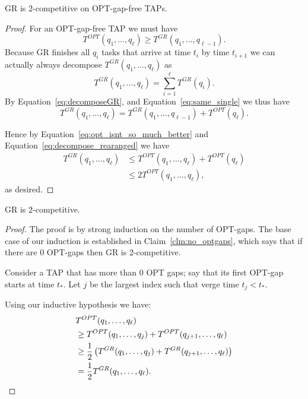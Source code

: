 \begin{claim}
  \label{clm:no_optgaps}
  GR is $2$-competitive on OPT-gap-free TAPs.
\end{claim}
\begin{proof}
  For an OPT-gap-free TAP we must have
  \begin{equation}
    \label{eq:opt_isnt_so_much_better}
    T^{OPT}(q_1, \ldots, q_{\ell}) \ge T^{GR}(q_1, \ldots, q_{\ell-1}).
  \end{equation}
  Because GR finishes all $q_{i}$ tasks that arrive at time $t_i$
  by time $t_{i+1}$ we can actually always decompose
  $T^{GR}(q_1, \ldots, q_\ell)$ as 
  \begin{equation}
    \label{eq:decomposeGR}
    T^{GR}(q_1, \ldots, q_\ell) = \sum_{i=1}^\ell T^{GR}(q_i).
  \end{equation}
  By Equation~\eqref{eq:decomposeGR}, and
  Equation~\eqref{eq:same_single} we thus have 
  \begin{equation}
    \label{eq:decompose_rearanged}
    T^{GR}(q_1, \ldots, q_\ell) = T^{GR}(q_1, \ldots, q_{\ell-1}) + T^{OPT}(q_\ell).
  \end{equation}

  Hence by Equation~\eqref{eq:opt_isnt_so_much_better} and
  Equation~\eqref{eq:decompose_rearanged} we have
  \begin{align*}
    T^{GR}(q_1, \ldots, q_\ell) &\le T^{OPT}(q_1, \ldots, q_\ell) + T^{OPT}(q_\ell)\\
                                   &\le 2T^{OPT}(q_1, \ldots, q_\ell),
  \end{align*}
  as desired.
\end{proof}

\begin{proposition}
  \label{prop:2competitive}
  GR is $2$-competitive.
\end{proposition}
\begin{proof}
  The proof is by strong induction on the number of OPT-gaps. 
  The base case of our induction is established in
  Claim~\ref{clm:no_optgaps}, which says that if there are $0$
  OPT-gaps then GR is $2$-competitive. 

  Consider a TAP that has more than $0$ OPT gaps;
  say that its first OPT-gap starts at time $t_*$.
  Let $j$ be the largest index such that verge time $t_j <
  t_*$.

  Using our inductive hypothesis we have:
  \begin{align*}
  &T^{OPT}(q_1, \ldots, q_\ell) \\
  &\ge T^{OPT}(q_1, \ldots, q_j) + T^{OPT}(q_{j+1}, \ldots, q_{\ell})\\
  &\ge \frac{1}{2}\left( T^{GR}(q_1, \ldots, q_j) + T^{GR}(q_{j+1}, \ldots, q_{\ell}) \right)\\
  &=\frac{1}{2} T^{GR}(q_1, \ldots, q_\ell).
  \end{align*}

\end{proof}

